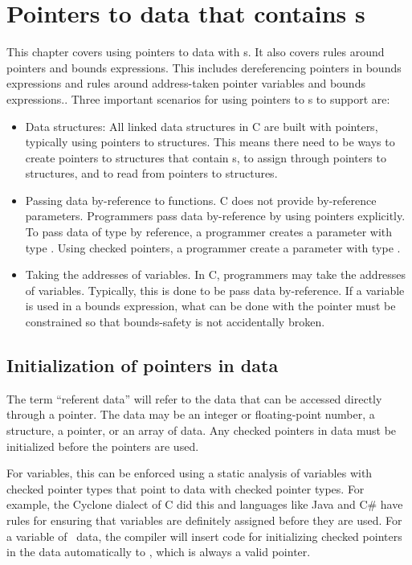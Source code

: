 
\chapter{Pointers to data that contains \plainarrayptr s}
\label{chapter:pointers-to-data-with-arrayptrs}

This chapter covers using pointers to data with \arrayptr s.  It also covers rules
around pointers and bounds expressions.  This includes dereferencing pointers
in bounds expressions and rules around address-taken pointer variables and
bounds expressions..
Three important scenarios for using pointers to \arrayptr s to support are:
\begin{itemize}
\item Data structures: All linked data structures in 
C are built with pointers, typically using pointers to structures.   This means
there need to be ways to create pointers to structures that contain \arrayptr s,
to assign through pointers to structures, and to read from pointers to structures.
\item Passing data by-reference to functions.  C does not provide by-reference
parameters.  Programmers pass data by-reference by using pointers explicitly.
To pass data of type  by reference, a programmer creates a parameter
with type .  Using checked pointers, a programmer create a parameter
with type \ptrT.
\item Taking the addresses of variables.  In C, programmers may take the
addresses of variables.  Typically, this is done to be pass data by-reference.
If a variable is used in a bounds expression, what can be done with the pointer
must be constrained so that bounds-safety is not accidentally broken.
\end{itemize}

\section{Initialization of pointers in data}

The term ``referent data'' will refer to the data that can be accessed
directly through a pointer.  The data may be an integer or floating-point number, a structure,
a pointer, or an array of data.   Any checked pointers in data must be initialized
before the pointers are used.

For variables, this can be enforced using a static 
analysis of variables with checked pointer types that point to data with checked
pointer types. For example, the Cyclone dialect of C \cite{Jim2002} did this
and languages like Java and C\# have rules for ensuring that variables
are definitely assigned before they are used.
For a variable of \arrayptr\ data, the compiler will insert code for 
initializing checked pointers in the data automatically to , which is always
a valid pointer.    

